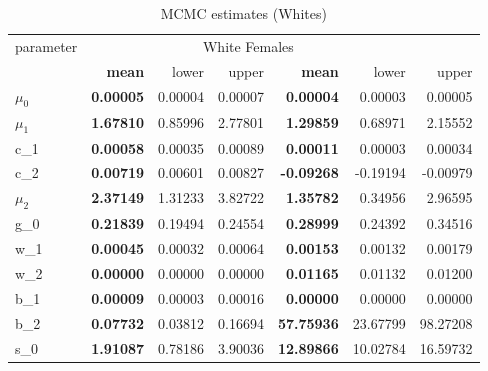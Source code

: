 \begin{table}

\caption{\label{tab:}MCMC estimates (Whites)}
\centering
\begin{tabular}[t]{l>{\bfseries\leavevmode\color{black}}rrr>{\bfseries\leavevmode\color{black}}rrr}
\toprule
\multicolumn{1}{c}{parameter} & \multicolumn{3}{c}{White Males} & \multicolumn{3}{c}{White Females} \\
\cmidrule(l{3pt}r{3pt}){1-1} \cmidrule(l{3pt}r{3pt}){2-4} \cmidrule(l{3pt}r{3pt}){5-7}
  & mean & lower & upper & mean & lower & upper\\
\midrule
$\mu_0$ & 0.00005 & 0.00004 & 0.00007 & 0.00004 & 0.00003 & 0.00005\\
$\mu_1$ & 1.67810 & 0.85996 & 2.77801 & 1.29859 & 0.68971 & 2.15552\\
c_1 & 0.00058 & 0.00035 & 0.00089 & 0.00011 & 0.00003 & 0.00034\\
c_2 & 0.00719 & 0.00601 & 0.00827 & -0.09268 & -0.19194 & -0.00979\\
$\mu_2$ & 2.37149 & 1.31233 & 3.82722 & 1.35782 & 0.34956 & 2.96595\\
g_0 & 0.21839 & 0.19494 & 0.24554 & 0.28999 & 0.24392 & 0.34516\\
\addlinespace
w_1 & 0.00045 & 0.00032 & 0.00064 & 0.00153 & 0.00132 & 0.00179\\
w_2 & 0.00000 & 0.00000 & 0.00000 & 0.01165 & 0.01132 & 0.01200\\
b_1 & 0.00009 & 0.00003 & 0.00016 & 0.00000 & 0.00000 & 0.00000\\
b_2 & 0.07732 & 0.03812 & 0.16694 & 57.75936 & 23.67799 & 98.27208\\
s_0 & 1.91087 & 0.78186 & 3.90036 & 12.89866 & 10.02784 & 16.59732\\
\bottomrule
\end{tabular}
\end{table}

